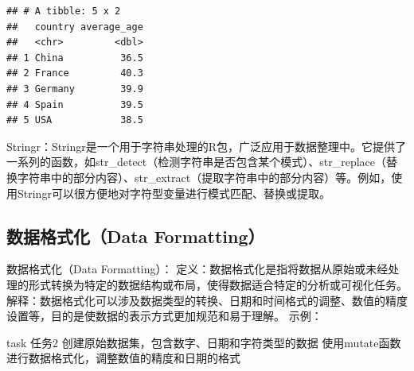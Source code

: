 \documentclass[]{book}
\newenvironment{Shaded}{\begin{snugshade}}{\end{snugshade}}
\newcommand{\CommentTok}[1]{\textcolor[rgb]{0.56,0.35,0.01}{\textit{#1}}}
\newcommand{\DataTypeTok}[1]{\textcolor[rgb]{0.13,0.29,0.53}{#1}}
\newcommand{\DecValTok}[1]{\textcolor[rgb]{0.00,0.00,0.81}{#1}}
\newcommand{\KeywordTok}[1]{\textcolor[rgb]{0.13,0.29,0.53}{\textbf{#1}}}
\newcommand{\NormalTok}[1]{#1}
\newcommand{\OperatorTok}[1]{\textcolor[rgb]{0.81,0.36,0.00}{\textbf{#1}}}
\newcommand{\StringTok}[1]{\textcolor[rgb]{0.31,0.60,0.02}{#1}}
\begin{document}
\begin{Shaded}
\end{Shaded}

\begin{verbatim}
## # A tibble: 5 x 2
##   country average_age
##   <chr>         <dbl>
## 1 China          36.5
## 2 France         40.3
## 3 Germany        39.9
## 4 Spain          39.5
## 5 USA            38.5
\end{verbatim}

Stringr：Stringr是一个用于字符串处理的R包，广泛应用于数据整理中。它提供了一系列的函数，如str\_detect（检测字符串是否包含某个模式）、str\_replace（替换字符串中的部分内容）、str\_extract（提取字符串中的部分内容）等。例如，使用Stringr可以很方便地对字符型变量进行模式匹配、替换或提取。

\hypertarget{ux6570ux636eux683cux5f0fux5316data-formatting}{%
\subsection{数据格式化（Data Formatting）}\label{ux6570ux636eux683cux5f0fux5316data-formatting}}

数据格式化（Data Formatting）：
定义：数据格式化是指将数据从原始或未经处理的形式转换为特定的数据结构或布局，使得数据适合特定的分析或可视化任务。
解释：数据格式化可以涉及数据类型的转换、日期和时间格式的调整、数值的精度设置等，目的是使数据的表示方式更加规范和易于理解。
示例：

\begin{infobox}task
任务2
创建原始数据集，包含数字、日期和字符类型的数据
使用mutate函数进行数据格式化，调整数值的精度和日期的格式

\end{infobox}
\end{document}
